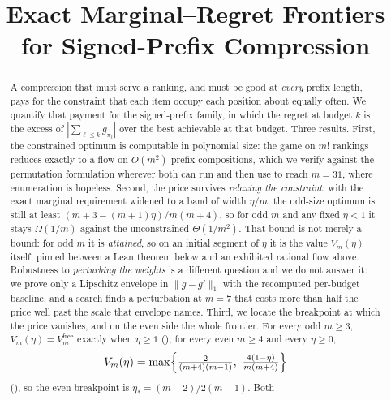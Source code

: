 



\title{Exact Marginal--Regret Frontiers\\for Signed-Prefix Compression}

\author{
}

\maketitle

\begin{abstract}
A compression that must serve a ranking, and must be good at \emph{every} prefix length,
pays for the constraint that each item occupy each position about equally often. We
quantify that payment for the signed-prefix family, in which the regret at budget $k$ is
the excess of $|\sum_{\ell\le k}g_{\pi_\ell}|$ over the best achievable at that budget.
Three results. First, the constrained optimum is computable in polynomial size: the game on
$m!$ rankings reduces exactly to a flow on $O(m^{2})$ prefix compositions, which we verify
against the permutation formulation wherever both can run and then use to reach $m=31$,
where enumeration is hopeless. Second, the price survives \emph{relaxing the constraint}: with the exact marginal
requirement widened to a band of width $\eta/m$, the odd-size optimum is still at least
$(m+3-(m+1)\eta)/m(m+4)$, so for odd $m$ and any fixed $\eta<1$ it stays $\Omega(1/m)$
against the unconstrained $\Theta(1/m^{2})$. That bound is not merely a bound: for odd $m$
it is \emph{attained}, so on an initial segment of $\eta$ it is the value $V_{m}(\eta)$
itself, pinned between a Lean theorem below and an exhibited rational flow above.
Robustness to \emph{perturbing the weights} is a different question and we do not answer
it: we prove only a Lipschitz envelope in $\|g-g'\|_{1}$ with the recomputed per-budget
baseline, and a search finds a perturbation at $m=7$ that costs more than half the price
well past the scale that envelope names. Third, we locate the breakpoint at which the price vanishes, and on the even side the
whole frontier. For every odd $m\ge3$, $V_{m}(\eta)=V^{\mathrm{free}}_{m}$ exactly when
$\eta\ge1$ (); for every even $m\ge4$ and every $\eta\ge0$,
\[
V_{m}(\eta)=\max\Bigl\{\tfrac{2}{(m+4)(m-1)},\ \tfrac{4(1-\eta)}{m(m+4)}\Bigr\}
\]
(), so the even breakpoint is $\eta_{*}=(m-2)/2(m-1)$. Both

\end{abstract}
